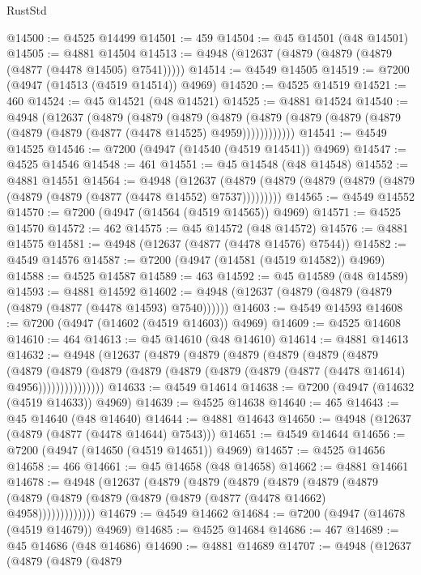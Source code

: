 \begin{lexlean}{RustStd}
\begin{coremodule}
{\begin{coremodule}
{{{{{{{{{{{{{{{{{{{{{{{{{{{{{{{{{{{{{{{{{{{{{{{{{{{{{{{{{{{{@14500 := @4525 @14499
@14501 := 459
@14504 := @45 @14501 (@48 @14501)
@14505 := @4881 @14504
@14513 := @4948 (@12637 (@4879 (@4879 (@4879 (@4877 (@4478 @14505) @7541)))))
@14514 := @4549 @14505
@14519 := @7200 (@4947 (@14513 (@4519 @14514)) @4969)
@14520 := @4525 @14519
@14521 := 460
@14524 := @45 @14521 (@48 @14521)
@14525 := @4881 @14524
@14540 := @4948
    (@12637
      (@4879
        (@4879
          (@4879
            (@4879 (@4879 (@4879 (@4879 (@4879 (@4879 (@4879 (@4877 (@4478 @14525) @4959))))))))))))
@14541 := @4549 @14525
@14546 := @7200 (@4947 (@14540 (@4519 @14541)) @4969)
@14547 := @4525 @14546
@14548 := 461
@14551 := @45 @14548 (@48 @14548)
@14552 := @4881 @14551
@14564 := @4948
    (@12637 (@4879 (@4879 (@4879 (@4879 (@4879 (@4879 (@4879 (@4877 (@4478 @14552) @7537)))))))))
@14565 := @4549 @14552
@14570 := @7200 (@4947 (@14564 (@4519 @14565)) @4969)
@14571 := @4525 @14570
@14572 := 462
@14575 := @45 @14572 (@48 @14572)
@14576 := @4881 @14575
@14581 := @4948 (@12637 (@4877 (@4478 @14576) @7544))
@14582 := @4549 @14576
@14587 := @7200 (@4947 (@14581 (@4519 @14582)) @4969)
@14588 := @4525 @14587
@14589 := 463
@14592 := @45 @14589 (@48 @14589)
@14593 := @4881 @14592
@14602 := @4948 (@12637 (@4879 (@4879 (@4879 (@4879 (@4877 (@4478 @14593) @7540))))))
@14603 := @4549 @14593
@14608 := @7200 (@4947 (@14602 (@4519 @14603)) @4969)
@14609 := @4525 @14608
@14610 := 464
@14613 := @45 @14610 (@48 @14610)
@14614 := @4881 @14613
@14632 := @4948
    (@12637
      (@4879
        (@4879
          (@4879
            (@4879
              (@4879
                (@4879
                  (@4879
                    (@4879
                      (@4879 (@4879 (@4879 (@4879 (@4879 (@4877 (@4478 @14614) @4956)))))))))))))))
@14633 := @4549 @14614
@14638 := @7200 (@4947 (@14632 (@4519 @14633)) @4969)
@14639 := @4525 @14638
@14640 := 465
@14643 := @45 @14640 (@48 @14640)
@14644 := @4881 @14643
@14650 := @4948 (@12637 (@4879 (@4877 (@4478 @14644) @7543)))
@14651 := @4549 @14644
@14656 := @7200 (@4947 (@14650 (@4519 @14651)) @4969)
@14657 := @4525 @14656
@14658 := 466
@14661 := @45 @14658 (@48 @14658)
@14662 := @4881 @14661
@14678 := @4948
    (@12637
      (@4879
        (@4879
          (@4879
            (@4879
              (@4879
                (@4879 (@4879 (@4879 (@4879 (@4879 (@4879 (@4877 (@4478 @14662) @4958)))))))))))))
@14679 := @4549 @14662
@14684 := @7200 (@4947 (@14678 (@4519 @14679)) @4969)
@14685 := @4525 @14684
@14686 := 467
@14689 := @45 @14686 (@48 @14686)
@14690 := @4881 @14689
@14707 := @4948
    (@12637
      (@4879
        (@4879
          (@4879
}}}}}}}}}}}}}}}}}}}}}}}}}}}}}}}}}}}}}}}}}}}}}}}}}}}}}}}}}}}}
\end{coremodule}}
\end{coremodule}
\end{lexlean}
